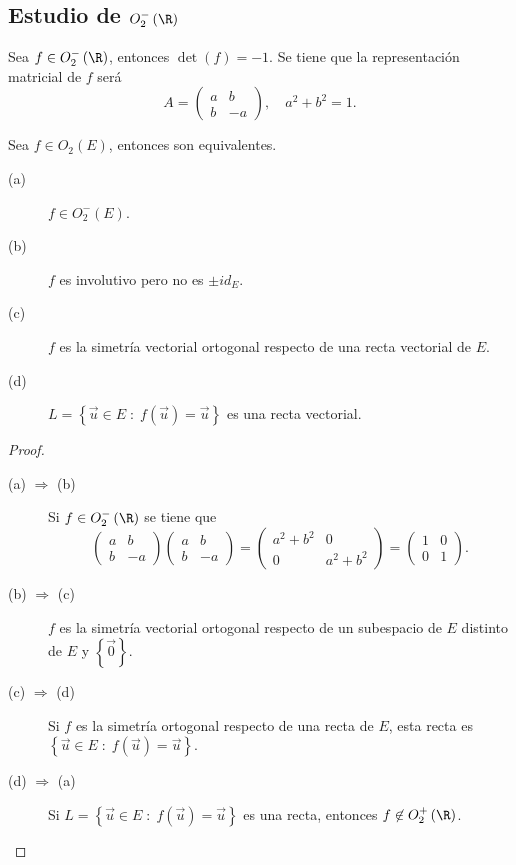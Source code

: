 \subsection*{Estudio de $\displaystyle O^{-}_{2}\left(\R\right) $ }
Sea $\displaystyle f \in O^{-}_{2}\left(\R\right) $, entonces $\displaystyle \det\left(f\right) = - 1 $. Se tiene que la representación matricial de $\displaystyle f $ será
\[ A = \begin{pmatrix} a & b \\ b & - a \end{pmatrix}, \quad a^{2} + b^{2} = 1 .\]
\begin{ftheorem}[]
\normalfont Sea $\displaystyle f \in O_{2}\left(E\right) $, entonces son equivalentes.
\begin{description}
\item[(a)] $\displaystyle f \in O^{-}_{2}\left(E\right) $.
\item[(b)] $\displaystyle f $ es involutivo pero no es $\displaystyle \pm id _{E} $.
\item[(c)] $\displaystyle f $ es la simetría vectorial ortogonal respecto de una recta vectorial de $\displaystyle E $.
\item[(d)] $\displaystyle L = \left\{ \vec{u} \in E\; : \; f\left(\vec{u}\right) = \vec{u}\right\}  $ es una recta vectorial.
\end{description}
\end{ftheorem}
\begin{proof}
\begin{description}
\item[(a) $\displaystyle \Rightarrow $ (b)] Si $\displaystyle f \in O^{-}_{2}\left(\R\right) $ se tiene que 
	\[\begin{pmatrix} a & b \\ b & - a \end{pmatrix}\begin{pmatrix} a & b \\ b & - a \end{pmatrix} = \begin{pmatrix} a^{2}+b^{2} & 0 \\ 0 & a^{2} + b^{2} \end{pmatrix} = \begin{pmatrix} 1 & 0 \\ 0 & 1 \end{pmatrix} .\]
\item[(b) $\displaystyle \Rightarrow $ (c)] $\displaystyle f $ es la simetría vectorial ortogonal respecto de un subespacio de $\displaystyle E $ distinto de $\displaystyle E $ y $\displaystyle \left\{ \vec{0}\right\}  $.
\item[(c) $\displaystyle \Rightarrow $ (d)] Si $\displaystyle f $ es la simetría ortogonal respecto de una recta de $\displaystyle E $, esta recta es $\displaystyle \left\{ \vec{u} \in E \; : \; f\left(\vec{u}\right) = \vec{u}\right\}  $.
\item[(d) $\displaystyle \Rightarrow $ (a)] Si $\displaystyle L = \left\{ \vec{u} \in E \; : \; f\left(\vec{u}\right) = \vec{u}\right\}  $ es una recta, entonces $\displaystyle f \not\in O^{+}_{2}\left(\R\right) $.
\end{description}
\end{proof}
